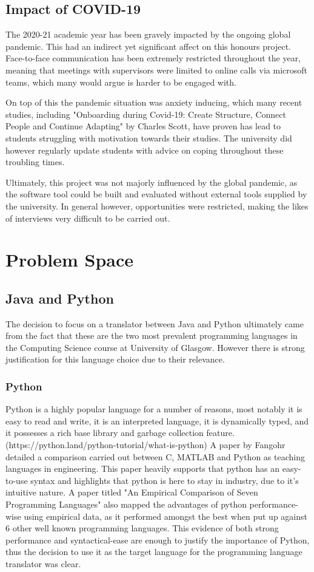 \documentclass{l4proj}
\begin{document}
\subsection{Impact of COVID-19}
The 2020-21 academic year has been gravely impacted by the ongoing global pandemic. This had an indirect yet significant affect on this honours project. Face-to-face communication has been extremely restricted throughout the year, meaning that meetings with supervisors were limited to online calls via microsoft teams, which many would argue is harder to be engaged with.

On top of this the pandemic situation was anxiety inducing, which many recent studies, including "Onboarding during Covid-19: Create Structure, Connect People and Continue Adapting" by Charles Scott, have proven has lead to students struggling with motivation towards their studies. The university did however regularly update students with advice on coping throughout these troubling times.

Ultimately, this project was not majorly influenced by the global pandemic, as the software tool could be built and evaluated without external tools supplied by the university. In general however, opportunities were restricted, making the likes of interviews very difficult to be carried out.

\section{Problem Space}
\subsection{Java and Python}

The decision to focus on a translator between Java and Python ultimately came from the fact that these are the two most prevalent programming languages in the Computing Science course at University of Glasgow. However there is strong justification for this language choice due to their relevance.

\subsubsection{Python}
Python is a highly popular language for a number of reasons, most notably it is easy to read and write, it is an interpreted language, it is dynamically typed, and it possesses a rich base library and garbage collection feature. (https://python.land/python-tutorial/what-is-python) A paper by Fangohr detailed a comparison carried out between C, MATLAB and Python as teaching languages in engineering. This paper heavily supports that python has an easy-to-use syntax and highlights that python is here to stay in industry, due to it's intuitive nature. A paper titled "An Empirical Comparison of Seven Programming Languages" also mapped the advantages of python performance-wise using empirical data, as it performed amongst the best when put up against 6 other well known programming languages. This evidence of both strong performance and syntactical-ease are enough to justify the importance of Python, thus the decision to use it as the target language for the programming language translator was clear.
\end{document}
